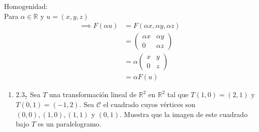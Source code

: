 \documentclass{article}
\begin{document}
\begin{enumerate}
			Homogenidad:\\
			Para \(\alpha \in \mathbb{R}\) y \(u=(x,y,z)\)
			\begin{equation*}
				\begin{aligned}
					\implies F(\alpha u) &=F(\alpha x, \alpha y, \alpha z)\\
										 &=\begin{pmatrix}
										 	\alpha x & \alpha y\\
										 	0        & \alpha z
										   \end{pmatrix}\\
										 &=\alpha \begin{pmatrix}
										 	x & y \\
										 	0 & z
										 \end{pmatrix}\\
										 &=\alpha F(u)
				\end{aligned}
			\end{equation*}
			
		\end{enumerate}
		
		\begin{enumerate}
			
			\item[] \(2.3_7\) Sea \(T\) una transformación lineal de \(\mathbb{R}^2\) en \(\mathbb{R}^2\) tal que \(T(1,0)=(2,1)\) y \(T(0,1)=(-1,2)\). Sea \(\mathscr{C}\) el cuadrado cuyos vértices son \((0,0),(1,0),(1,1)\) y \((0,1)\). Muestra que la imagen de este cuadrado bajo \(T\) es un paralelogramo.
			
		\end{enumerate}
		
\end{document}
